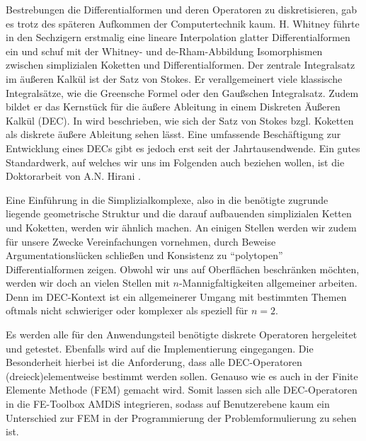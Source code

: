 Bestrebungen die Differentialformen und deren Operatoren zu diskretisieren, gab es trotz des späteren Aufkommen der Computertechnik kaum.
H. Whitney \cite{whitney} führte in den Sechzigern erstmalig eine lineare Interpolation glatter Differentialformen ein 
und schuf mit der Whitney- und de-Rham-Abbildung Isomorphismen zwischen simplizialen Koketten und Differentialformen.
Der zentrale Integralsatz im äußeren Kalkül ist der Satz von Stokes.
Er verallgemeinert viele klassische Integralsätze, wie die Greensche Formel oder den Gaußschen Integralsatz.
Zudem bildet er das Kernstück für die äußere Ableitung in einem Diskreten Äußeren Kalkül (DEC).
In \cite[7.2C]{Marsden} wird beschrieben, wie sich der Satz von Stokes bzgl. Koketten als diskrete äußere Ableitung sehen lässt.
Eine umfassende Beschäftigung zur Entwicklung eines DECs gibt es jedoch erst seit der Jahrtausendwende.
Ein gutes Standardwerk, auf welches wir uns im Folgenden auch beziehen wollen, ist die Doktorarbeit von A.N. Hirani \cite{hirani}.

Eine Einführung in die Simplizialkomplexe, also in die benötigte zugrunde liegende geometrische Struktur und die darauf aufbauenden
simplizialen Ketten und Koketten, werden wir ähnlich machen.
An einigen Stellen werden wir zudem für unsere Zwecke Vereinfachungen vornehmen, durch Beweise Argumentationslücken schließen und Konsistenz zu "`polytopen"' Differentialformen zeigen.
Obwohl wir uns auf Oberflächen beschränken möchten, werden wir doch an vielen Stellen mit \( n \)-Mannigfaltigkeiten allgemeiner arbeiten.
Denn im DEC-Kontext ist ein allgemeinerer Umgang mit bestimmten Themen oftmals nicht schwieriger oder komplexer als speziell für \( n=2 \). 

Es werden alle für den Anwendungsteil benötigte diskrete Operatoren hergeleitet und getestet.
Ebenfalls wird auf die Implementierung eingegangen.
Die Besonderheit hierbei ist die Anforderung, dass alle DEC-Operatoren (dreieck)elementweise bestimmt werden sollen.
Genauso wie es auch in der Finite Elemente Methode (FEM) gemacht wird. 
Somit lassen sich alle DEC-Operatoren in die FE-Toolbox AMDiS integrieren, sodass auf Benutzerebene kaum ein Unterschied zur FEM in der
Programmierung der Problemformulierung zu sehen ist.


